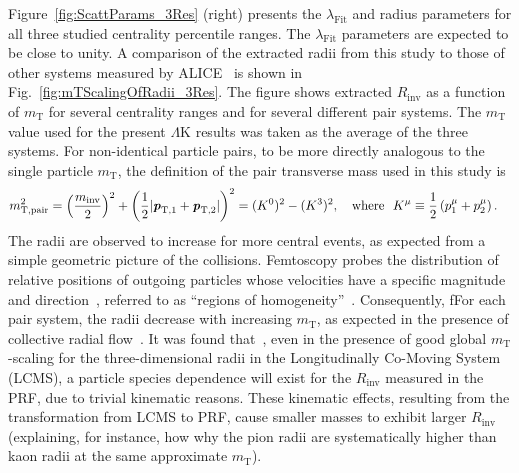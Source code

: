 \documentclass[ALICE,manyauthors]{cernphprep}
\newcommand{\mt}{$m_{\mathrm{T}}$\xspace}
\newcommand{\LamK}{$\Lambda$K\xspace}
\begin{document}
Figure~\ref{fig:ScattParams_3Res} (right) presents the $\lambda_{\mathrm{Fit}}$ and radius parameters for all three studied centrality percentile ranges.
The $\lambda_{\mathrm{Fit}}$ parameters are expected to be close to unity. 
A comparison of the extracted radii from this study to those of other systems measured by ALICE~\cite{Adam:2015vja} is shown in Fig.~\ref{fig:mTScalingOfRadii_3Res}. 
The figure shows {\color{red}extracted} $R_{\mathrm{inv}}$ as a function of \mt for several centrality ranges and for several different pair systems.
The \mt value used for the present \LamK results was taken as the average of the three systems.
For non-identical particle pairs, to be more directly analogous to the single particle \mt, the definition of the pair transverse mass used in this study is
\begin{equation}
\begin{aligned}
 m_{\mathrm{T, pair}}^{2} &= \left( \frac{m_{\mathrm{inv}}}{2} \right)^{2} + \left( \frac{1}{2} |\textbf{\textit{p}}_{\mathrm{T,1}} + \textbf{\textit{p}}_{\mathrm{T,2}}| \right)^{2} = (K^{0})^{2} - (K^{3})^{2}, \quad \mathrm{where} ~~K^{\mu} \equiv \frac{1}{2} \left( p_{1}^{\mu} + p_{2}^{\mu} \right).
\end{aligned}
\label{eqn:PairmTv1}
\end{equation}
The radii are observed to increase for more central events, as expected from a simple geometric picture of the collisions.
{\color{blue}Femtoscopy probes the distribution of relative positions of outgoing particles whose velocities have a specific magnitude and direction~\cite{Lisa:2005dd}, referred to as ``regions of homogeneity''~\cite{Akkelin:1995gh}.}
{\color{blue}Consequently, f}{\color{red}F}or each pair system, the radii decrease with increasing \mt, as expected in the presence of collective radial flow~\cite{Akkelin:1995gh}.
It was found that~\cite{Kisiel:2014upa}, even in the presence of {\color{red}good} global \mt-scaling for the three-dimensional radii in the Longitudinally Co-Moving System (LCMS), a particle species dependence will exist for the $R_{\mathrm{inv}}$ measured in the PRF, due to trivial kinematic reasons.
These kinematic effects, resulting from the transformation from LCMS to PRF, cause smaller masses to exhibit larger $R_{\mathrm{inv}}$~\cite{Adam:2015vja} (explaining, for instance, {\color{red}how} {\color{blue}why} the pion radii are systematically higher than kaon radii at the same approximate \mt).
\end{document}
